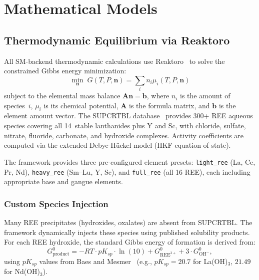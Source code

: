 \documentclass[11pt]{article}
\begin{document}
\section{Mathematical Models}\label{sec:methods}

\subsection{Thermodynamic Equilibrium via Reaktoro}

All SM-backend thermodynamic calculations use
Reaktoro~\citep{leal2015reaktoro} to solve the constrained Gibbs energy
minimization:
\begin{equation}\label{eq:gibbs}
  \min_{\mathbf{n}} \; G(T, P, \mathbf{n})
    = \sum_i n_i \mu_i(T, P, \mathbf{n})
\end{equation}
subject to the elemental mass balance $\mathbf{A}\mathbf{n} = \mathbf{b}$,
where $n_i$ is the amount of species~$i$, $\mu_i$ is its chemical
potential, $\mathbf{A}$ is the formula matrix, and $\mathbf{b}$ is the
element amount vector.  The SUPCRTBL database~\citep{zimmer2016supcrtbl}
provides 300+ REE aqueous species covering all 14~stable lanthanides plus
Y and Sc, with chloride, sulfate, nitrate, fluoride, carbonate, and
hydroxide complexes.  Activity coefficients are computed via the extended
Debye-H\"uckel model (HKF equation of state).

The framework provides three pre-configured element presets:
\texttt{light\_ree} (La, Ce, Pr, Nd), \texttt{heavy\_ree} (Sm--Lu, Y, Sc),
and \texttt{full\_ree} (all 16 REE), each including appropriate base and
gangue elements.

\subsubsection{Custom Species Injection}

Many REE precipitates (hydroxides, oxalates) are absent from SUPCRTBL.
The framework dynamically injects these species using published solubility
products.  For each REE hydroxide, the standard Gibbs energy of formation
is derived from:
\begin{equation}\label{eq:ksp}
  G^0_{\text{product}} = -RT \cdot pK_{sp} \cdot \ln(10)
    + G^0_{\text{REE}^{3+}} + 3 \cdot G^0_{\text{OH}^-},
\end{equation}
using $pK_{sp}$ values from Baes and Mesmer~\citep{baes1976hydrolysis}
(e.g., $pK_{sp} = 20.7$ for La(OH)$_3$, $21.49$ for Nd(OH)$_3$).
\end{document}
